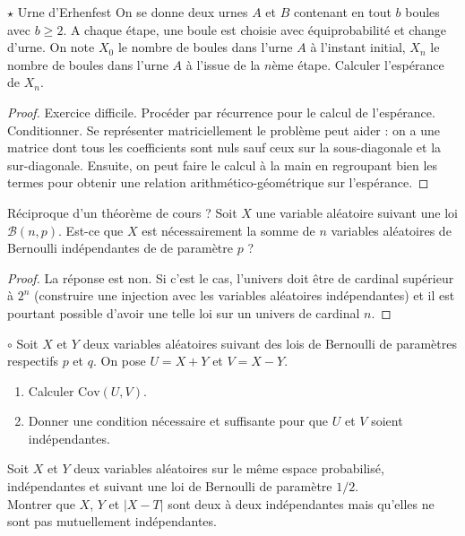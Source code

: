 \documentclass[french,a4paper]{article}
\theoremstyle{plain}
\theoremstyle{definition}
\theoremstyle{remark}
\begin{document}
\begin{ex}[Moulin.23]{$\star$ Urne d'Erhenfest}
	On se donne deux urnes $A$ et $B$ contenant en tout $b$ boules avec $b\geqslant2$. A chaque étape, une boule est choisie avec équiprobabilité et change d'urne. On note $X_0$ le nombre de boules dans l'urne $A$ à l'instant initial, $X_n$ le nombre de boules dans l'urne $A$ à l'issue de la $n$ème étape. Calculer l'espérance de $X_n$.
\end{ex}
\begin{proof}
	Exercice difficile. Procéder par récurrence pour le calcul de l'espérance. Conditionner. Se représenter matriciellement le problème peut aider : on a une matrice dont tous les coefficients sont nuls sauf ceux sur la sous-diagonale et la sur-diagonale. Ensuite, on peut faire le calcul à la main en regroupant bien les termes pour obtenir une relation arithmético-géométrique sur l'espérance.
\end{proof}

\begin{ex}[Moulin.24]{Réciproque d'un théorème de cours ?}
	Soit $X$ une variable aléatoire suivant une loi $\mathcal{B}(n,p)$. Est-ce que $X$ est nécessairement la somme de $n$ variables aléatoires de Bernoulli indépendantes de de paramètre $p$ ?
\end{ex}
\begin{proof}
	La réponse est non. Si c'est le cas, l'univers doit être de cardinal supérieur à $2^n$ (construire une injection avec les variables aléatoires indépendantes) et il est pourtant possible d'avoir une telle loi sur un univers de cardinal $n$.
\end{proof}

\begin{ex}[Moulin.25]{$\circ$}
	Soit $X$ et $Y$ deux variables aléatoires suivant des lois de Bernoulli de paramètres respectifs $p$ et $q$. On pose $U=X+Y$ et $V=X-Y$.
	\begin{enumerate}
		\item Calculer $\text{Cov}(U,V)$.
		\item Donner une condition nécessaire et suffisante pour que $U$ et $V$ soient indépendantes.
	\end{enumerate}
\end{ex}

\begin{ex}[Moulin.26]{}
	Soit $X$ et $Y$ deux variables aléatoires sur le même espace probabilisé, indépendantes et suivant une loi de Bernoulli de paramètre $1/2$. \\ Montrer que $X$, $Y$ et $\lvert X-T\rvert$ sont deux à deux indépendantes mais qu'elles ne sont pas mutuellement indépendantes.
\end{ex}
\end{document}
